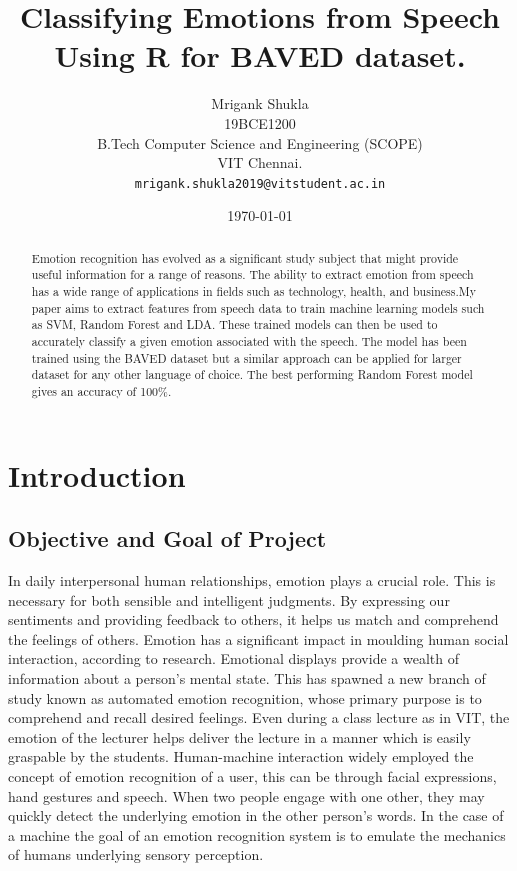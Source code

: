 \documentclass[11pt,a4paper]{article}
\title{ Classifying Emotions from Speech Using R for BAVED dataset.}
\author{Mrigank Shukla\\
	19BCE1200  \\
	B.Tech Computer Science and Engineering (SCOPE)\\
	VIT Chennai. \\
	\texttt{mrigank.shukla2019@vitstudent.ac.in} %
}
\date{\today}
\begin{document}
	
    \tableofcontents
		\newpage
		\maketitle
	\begin{abstract}
		Emotion recognition has evolved as a significant study subject that might provide useful information for a range of reasons.
		The ability to extract emotion from speech has a wide range of applications in fields such as technology, health, and business.My paper aims to extract features from speech data to train machine learning models such as SVM, Random Forest and LDA. These trained models can then be used to accurately classify a given emotion associated with the speech. The model has been trained using the BAVED  \cite{a_2019} dataset but a similar approach can be applied for larger dataset for any other language of choice. The best performing Random Forest model gives an accuracy of 100\%.
	\end{abstract}
	

	
	\section{Introduction}
	\subsection{Objective and Goal of Project}
	In daily interpersonal human relationships, emotion plays a crucial role. This is necessary for both sensible and intelligent judgments. By expressing our sentiments and providing feedback to others, it helps us match and comprehend the feelings of others. Emotion has a significant impact in moulding human social interaction, according to research. Emotional displays provide a wealth of information about a person's mental state. This has spawned a new branch of study known as automated emotion recognition, whose primary purpose is to comprehend and recall desired feelings. Even during a class lecture as in VIT, the emotion of the lecturer helps deliver the lecture in a manner which is easily graspable by the students. Human-machine interaction \cite{erol2019toward} widely employed the concept of emotion recognition of a user, this can be through facial expressions, hand gestures \cite{ragot2017emotion} and speech. When two people engage with one other, they may quickly detect the underlying emotion \cite{sun2020language} in the other person's words. In the case of a machine the goal of an emotion recognition system is to emulate the mechanics of humans underlying sensory perception. 
\end{document}
